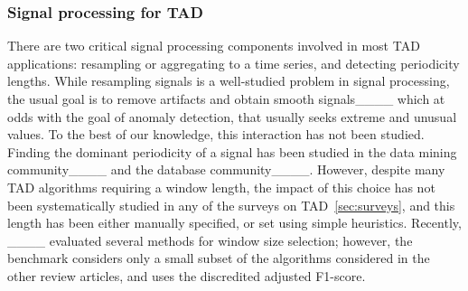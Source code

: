 \subsubsection{Signal processing for TAD}
There are two critical signal processing components involved in most TAD applications: resampling or aggregating to a time series, and detecting periodicity lengths. While resampling signals is a well-studied problem in signal processing, the usual goal is to remove artifacts and obtain smooth signals____ which at odds with the goal of anomaly detection, that usually seeks extreme and unusual values. To the best of our knowledge, this interaction has not been studied.
Finding the dominant periodicity of a signal has been studied in the data mining community____ and the database community____.
However, despite many TAD algorithms requiring a window length, the impact of this choice has not been systematically studied in any of the surveys on TAD~\ref{sec:surveys}, and this length has been either manually specified, or set using simple heuristics. Recently, ____ evaluated several methods for window size selection; however, the benchmark considers only a small subset of the algorithms considered in the other review articles, and uses the discredited adjusted F1-score.